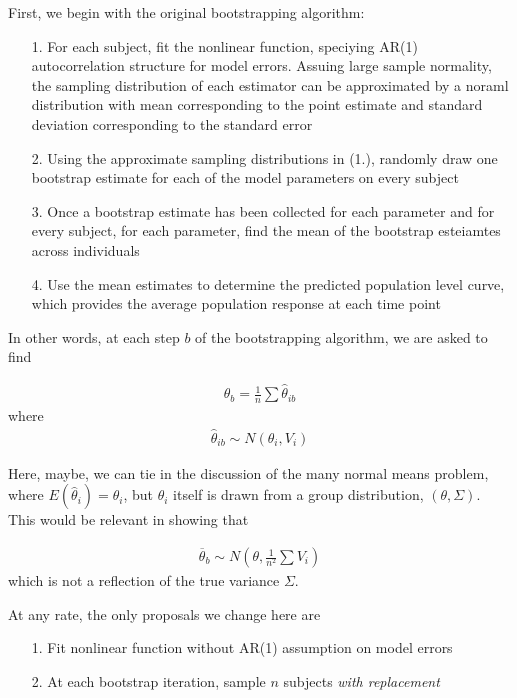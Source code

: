 \documentclass{article}
\begin{document}
First, we begin with the original bootstrapping algorithm:

\begin{enumerate}
\item[1.] For each subject, fit the nonlinear function, speciying AR(1) autocorrelation structure for model errors. Assuing large sample normality, the sampling distribution of each estimator can be approximated by a noraml distribution with mean corresponding to the point estimate and standard deviation corresponding to the standard error

\item[2.] Using the approximate sampling distributions in (1.), randomly draw one bootstrap estimate for each of the model parameters on every subject

\item[3.] Once a bootstrap estimate has been collected for each parameter and for every subject, for each parameter, find the mean of the bootstrap esteiamtes across individuals

\item[4.] Use the mean estimates to determine the predicted population level curve, which provides the average population response at each time point
\end{enumerate}

In other words, at each step $b$ of the bootstrapping algorithm, we are asked to find

\begin{align*}
\theta_b = \frac 1n \sum \hat{\theta}_{ib}
\end{align*}
where
\begin{align*}
\hat{\theta}_{ib} \sim N(\theta_i, V_i)
\end{align*}

Here, maybe, we can tie in the discussion of the many normal means problem, where $E (\hat{\theta}_i) = \theta_i$, but $\theta_i$ itself is drawn from a group distribution, $(\theta, \Sigma)$. This would be relevant in showing that

\begin{align*}
\overline{\theta}_b \sim N \left(\theta, \frac{1}{n^2} \sum V_i \right)
\end{align*}
which is not a reflection of the true variance $\Sigma$.

At any rate, the only proposals we change here are

\begin{enumerate}
\item[1.] Fit nonlinear function without AR(1) assumption on model errors
\item[2.] At each bootstrap iteration, sample $n$ subjects \textit{with replacement}
\end{enumerate}
\end{document}
